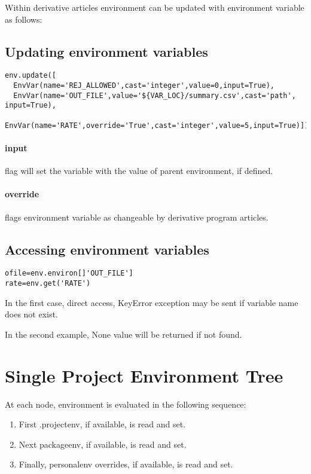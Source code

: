 \documentclass[environ_design.tex]{subfiles}
\begin{document}
Within derivative articles environment can be updated with environment variable as follows:

\subsection{Updating environment variables}
\begin{lstlisting}
env.update([
  EnvVar(name='REJ_ALLOWED',cast='integer',value=0,input=True),
  EnvVar(name='OUT_FILE',value='${VAR_LOC}/summary.csv',cast='path', input=True),
  EnvVar(name='RATE',override='True',cast='integer',value=5,input=True)])
\end{lstlisting}

\paragraph{input} flag will set the variable with the value of parent environment, if defined.
\paragraph{override} flags environment variable as changeable by derivative program articles.

\subsection{Accessing environment variables}
\begin{lstlisting}
ofile=env.environ[]'OUT_FILE']
rate=env.get('RATE')
\end{lstlisting}

In the first case, direct access, KeyError exception may be sent if variable name does not exist.

In the second example, None value will be returned if not found. 


\section{Single Project Environment Tree}
At each node, environment is evaluated in the following sequence:
\begin{enumerate}
	\item First .projectenv, if available, is read and set.
	\item Next packageenv, if available, is read and set.
	\item Finally, personalenv overrides, if available, is read and set.
\end{enumerate} 
\end{document}
